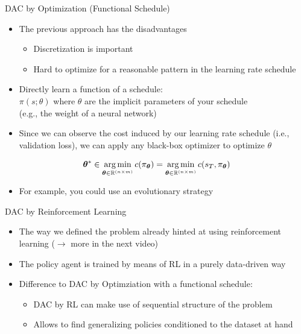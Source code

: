 \begin{frame}[c,fragile]{DAC by Optimization (Functional Schedule)}
	
	
	\begin{itemize}
	    \item The previous approach has the disadvantages
	    \begin{itemize}
	        \item Discretization is important
	        \item Hard to optimize for a reasonable pattern in the learning rate schedule
	    \end{itemize}
	    \smallskip
	    \pause
	    \item Directly learn a function of a schedule:\\ $\pi(s; \theta)$ where $\theta$ are the implicit parameters of your schedule\\ (e.g., the weight of a neural network)
	    \pause
	    \item Since we can observe the cost induced by our learning rate schedule (i.e., validation loss), we can apply any black-box optimizer to optimize $\theta$
	\end{itemize}
	
	\begin{equation}
	    \bm{\theta}^* \in \operatorname*{arg\,min}_{\bm{\theta} \in \mathbb{R}^{(n\times m)}}  c(\pi_{\bm{\theta}}) = \operatorname*{arg\,min}_{\bm{\theta} \in \mathbb{R}^{(n\times m)}} c(s_T,\pi_{\bm{\theta}})\nonumber
	\end{equation}
	
	\begin{itemize}
	    \item For example, you could use an evolutionary strategy~
	\end{itemize}
	
	
\end{frame}
\begin{frame}[c,fragile]{DAC by Reinforcement Learning}
	
	\centering
    
	
	\begin{itemize}
	    \item The way we defined the problem already hinted at using reinforcement learning ($\rightarrow$ more in the next video)
	    \item The policy agent is trained by means of RL in a purely data-driven way
	    \item Difference to DAC by Optimziation with a functional schedule:
	    \begin{itemize}
	        \item DAC by RL can make use of sequential structure of the problem
	        \item Allows to find generalizing policies conditioned to the dataset at hand
	    \end{itemize}
	\end{itemize}
	
\end{frame}
